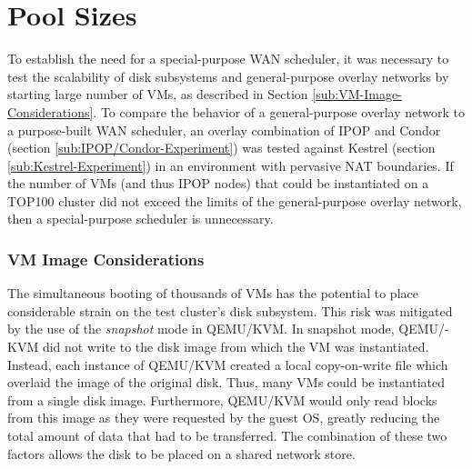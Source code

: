 \section{\label{sub:Pool-Sizes}Pool Sizes}

To establish the need for a special-purpose WAN scheduler, it was
necessary to test the scalability of disk subsystems and general-purpose
overlay networks by starting large number of VMs, as described in
Section \ref{sub:VM-Image-Considerations}. To compare the behavior
of a general-purpose overlay network to a purpose-built WAN scheduler,
an overlay combination of IPOP and Condor (section \ref{sub:IPOP/Condor-Experiment})
was tested against Kestrel (section \ref{sub:Kestrel-Experiment})
in an environment with pervasive NAT boundaries. If the number of
VMs (and thus IPOP nodes) that could be instantiated on a TOP100 cluster
did not exceed the limits of the general-purpose overlay network,
then a special-purpose scheduler is unnecessary. 


\subsubsection{\label{sub:VM-Image-Considerations}VM Image Considerations}

The simultaneous booting of thousands of VMs has the potential to
place considerable strain on the test cluster's disk subsystem. This
risk was mitigated by the use of the \emph{snapshot} mode in QEMU/KVM.
In snapshot mode, QEMU/-KVM did not write to the disk image from which
the VM was instantiated. Instead, each instance of QEMU/KVM created
a local copy-on-write file which overlaid the image of the original
disk. Thus, many VMs could be instantiated from a single disk image.
Furthermore, QEMU/KVM would only read blocks from this image as they
were requested by the guest OS, greatly reducing the total amount
of data that had to be transferred. The combination of these two factors
allows the disk to be placed on a shared network store.


